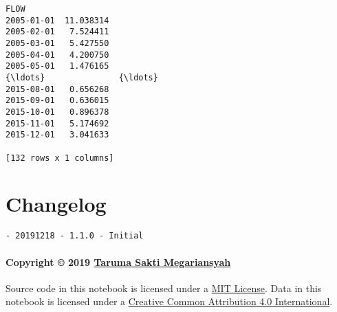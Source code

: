 \documentclass[11pt]{article}
\makeatletter
\newcommand{\boxspacing}{\kern\kvtcb@left@rule\kern\kvtcb@boxsep}
\newcommand{\prompt}[4]{
        {\ttfamily\llap{{\color{#2}[#3]:\hspace{3pt}#4}}\vspace{-\baselineskip}}
    }
\makeatother
\begin{document}
            \begin{tcolorbox}[breakable, size=fbox, boxrule=.5pt, pad at break*=1mm, opacityfill=0]
\prompt{Out}{outcolor}{ }{\boxspacing}
\begin{Verbatim}[commandchars=\\\{\}]
                 FLOW
2005-01-01  11.038314
2005-02-01   7.524411
2005-03-01   5.427550
2005-04-01   4.200750
2005-05-01   1.476165
{\ldots}               {\ldots}
2015-08-01   0.656268
2015-09-01   0.636015
2015-10-01   0.896378
2015-11-01   5.174692
2015-12-01   3.041633

[132 rows x 1 columns]
\end{Verbatim}
\end{tcolorbox}
        
    \hypertarget{changelog}{%
\section{Changelog}\label{changelog}}

\begin{verbatim}
- 20191218 - 1.1.0 - Initial
\end{verbatim}

\hypertarget{copyright-2019-taruma-sakti-megariansyah}{%
\paragraph{\texorpdfstring{Copyright © 2019
\href{https://taruma.github.io}{Taruma Sakti
Megariansyah}}{Copyright © 2019 Taruma Sakti Megariansyah}}\label{copyright-2019-taruma-sakti-megariansyah}}

Source code in this notebook is licensed under a
\href{https://choosealicense.com/licenses/mit/}{MIT License}. Data in
this notebook is licensed under a
\href{https://creativecommons.org/licenses/by/4.0/}{Creative Common
Attribution 4.0 International}.


    
    
    
\end{document}
